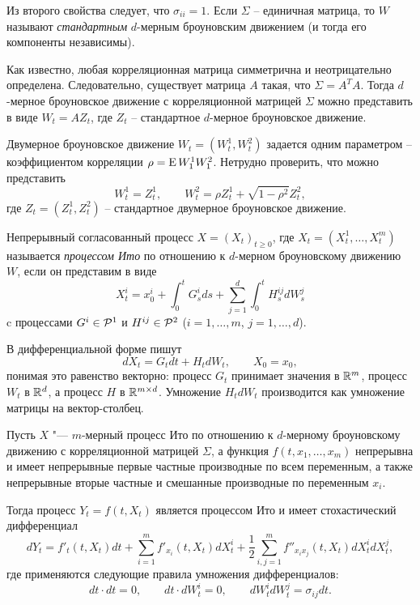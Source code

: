 Из второго свойства следует, что $\sigma_{ii}=1$.
Если $\Sigma$ -- единичная матрица, то $W$ называют \emph{стандартным} $d$-мерным броуновским движением (и тогда его компоненты независимы).

\begin{remark}
Как известно, любая корреляционная матрица симметрична и неотрицательно определена. Следовательно, существует матрица $A$ такая, что $\Sigma = A^TA$.
Тогда $d$-мерное броуновское движение с корреляционной матрицей $\Sigma$ можно представить в виде $W_t = A Z_t$, где $Z_t$ -- стандартное $d$-мерное броуновское движение.
\end{remark}

\begin{example}
Двумерное броуновское движение $W_t=(W_t^1,W_t^2)$ задается одним параметром -- коэффициентом корреляции $\rho = \operatorname{E} W_1^1W_1^2$.
Нетрудно проверить, что можно представить
\[
W_t^1 = Z_t^1, \qquad W_t^2 = \rho Z_t^1 + \sqrt{1-\rho^2} Z_t^2,
\]
где $Z_t = (Z_t^1,Z_t^2)$ -- стандартное двумерное броуновское движение.
\end{example}


\begin{definition}
Непрерывный согласованный процесс $X=(X_t)_{t\ge0}$, где $X_t=(X_t^1,\dots,X_t^m)$ называется \emph{процессом Ито} по отношению к $d$-мерном броуновскому движению $W$, если он представим в виде
\[
X_t^i = x_0^i + \int_0^t G_s^i ds + \sum_{j=1}^d\int_0^t H_s^{ij} d W_s^j
\]
c процессами $G^i \in \mathcal{P}^1$ и $H^{ij}\in \mathcal{P}^2$ ($i=1,\dots,m$, $j=1,\dots,d$). 

В дифференциальной форме пишут
\[
d X_t = G_t dt + H_t dW_t, \qquad X_0=x_0,
\]
понимая это равенство векторно: процесс $G_t$ принимает значения в $\mathbb{R}^m$, процесс $W_t$ в $\mathbb{R}^d$, а процесс $H$ в $\mathbb{R}^{m\times d}$.
Умножение $H_tdW_t$ производится как умножение матрицы на вектор-столбец.
\end{definition}

\begin{theorem}
Пусть $X$ "--- $m$-мерный процесс Ито по отношению к $d$-мерному броуновскому движению с корреляционной матрицей $\Sigma$, а функция $f(t,x_1,\dots,x_m)$ непрерывна и имеет непрерывные первые частные производные по всем переменным, а также непрерывные вторые частные и смешанные производные по переменным $x_i$.

Тогда процесс $Y_t = f(t,X_t)$ является процессом Ито и имеет стохастический дифференциал
\[
d Y_t = f'_t(t,X_t) dt + \sum_{i=1}^m f'_{x_i}(t,X_t) dX_t^i + \frac12 \sum_{i,j=1}^m f''_{x_i x_j}(t,X_t) dX_t^i dX_t^j,
\]
где применяются следующие правила умножения дифференциалов:
\[
dt\cdot dt = 0, \qquad dt\cdot dW_t^i = 0, \qquad dW_t^i dW_t^j = \sigma_{ij} dt.
\]
\end{theorem}

